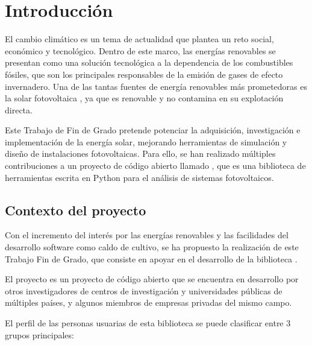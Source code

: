 \chapter{Introducción} \label{chp:intro}

El cambio climático es un tema de actualidad que plantea un reto social, económico y tecnológico. Dentro de este marco, las energías renovables se presentan como una solución tecnológica a la dependencia de los combustibles fósiles, que son los principales responsables de la emisión de gases de efecto invernadero. Una de las tantas fuentes de energía renovables más prometedoras es la solar fotovoltaica \cite{Breyer_Bogdanov_Gulagi_Aghahosseini_Barbosa_Koskinen_Barasa_Caldera_Afanasyeva_Child_et_al_2017}, ya que es renovable y no contamina en su explotación directa.

Este Trabajo de Fin de Grado pretende potenciar la adquisición, investigación e implementación de la energía solar, mejorando herramientas de simulación y diseño de instalaciones fotovoltaicas. Para ello, se han realizado múltiples contribuciones a un proyecto de código abierto llamado \pvlibpy{} \cite{Anderson_Hansen_Holmgren_Jensen_Mikofski_Driesse_2023, Stein_2012, Andrews_Stein_Hansen_Riley_2014, Holmgren_Andrews_Lorenzo_Stein_2015, Holmgren_Groenendyk_2016}, que es una biblioteca de herramientas escrita en Python para el análisis de sistemas fotovoltaicos.


\section{Contexto del proyecto} \label{sct:intro:contexto}

Con el incremento del interés por las energías renovables y las facilidades del desarrollo software como caldo de cultivo, se ha propuesto la realización de este Trabajo Fin de Grado, que consiste en apoyar en el desarrollo de la biblioteca \pvlibpy.

El proyecto \pvlibpy{} es un proyecto de código abierto que se encuentra en desarrollo por otros investigadores de centros de investigación y universidades públicas de múltiples países, y algunos miembros de empresas privadas del mismo campo.

El perfil de las personas usuarias de esta biblioteca se puede clasificar entre 3 grupos principales:

